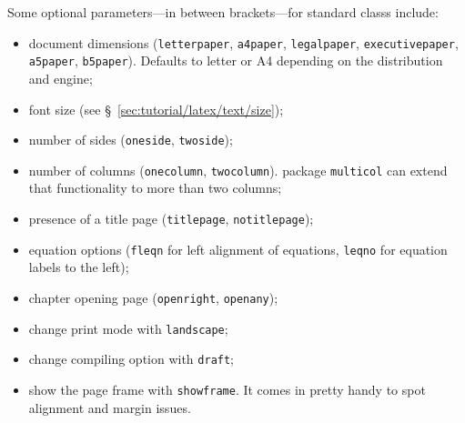 \noindent Some optional \glspl{parameter}---in between brackets---for standard \glspl{class} include:
\begin{itemize}
    \item document dimensions (\texttt{letterpaper}, \texttt{a4paper}, \texttt{legalpaper}, \texttt{executivepaper}, \texttt{a5paper}, \texttt{b5paper}). Defaults to letter or A4 depending on the distribution and engine;
    \item font size (see \S~\ref{sec:tutorial/latex/text/size});
    \item number of sides (\texttt{oneside}, \texttt{twoside});
    \item number of columns (\texttt{onecolumn}, \texttt{twocolumn}). \Gls{package} \texttt{multicol} can extend that functionality to more than two columns;
    \item presence of a title page (\texttt{titlepage}, \texttt{notitlepage});
    \item equation options (\texttt{fleqn} for left alignment of equations, \texttt{leqno} for equation labels to the left);
    \item chapter opening page (\texttt{openright}, \texttt{openany});
    \item change print mode with \texttt{landscape};
    \item change compiling option with \texttt{draft};
    \item show the page frame with \texttt{showframe}. It comes in pretty handy to spot alignment and margin issues.
\end{itemize}